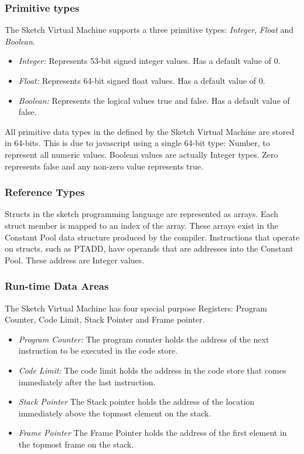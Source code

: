 \documentclass{l3proj}
\begin{document}
\subsubsection{Primitive types}
The Sketch Virtual Machine supports a three primitive types: \textit{Integer}, \textit{Float} and \textit{Boolean}.
\begin{itemize}
	\item \textit{Integer:} Represents 53-bit signed integer values. Has a default value of 0. 
	\item \textit{Float:} Represents 64-bit signed float values. Has a default value of 0.
	\item \textit{Boolean:} Represents the logical values true and false. Has a default value of false.
\end{itemize}
All primitive data types in the defined by the Sketch Virtual Machine are stored in 64-bits. This is due to javascript using a single 64-bit type: Number, to represent all numeric values. Boolean values are actually Integer types. Zero represents false and any non-zero value represents true.

\subsubsection{Reference Types}
Structs in the sketch programming language are represented as arrays. Each struct member is mapped to an index of the array. These arrays exist in the Constant Pool data structure produced by the compiler. Instructions that operate on structs, such as PTADD, have operands that are addresses into the Constant Pool. These address are Integer values.

\subsubsection{Run-time Data Areas}
The Sketch Virtual Machine has four special purpose Registers: Program Counter, Code Limit, Stack Pointer and Frame pointer.
\begin{itemize}
	\item\textit{Program Counter:} The program counter holds the address of the next instruction to be executed in the code store.
	\item\textit{Code Limit:} The code limit holds the address in the code store that comes immediately after the last instruction.
	\item\textit{Stack Pointer} The Stack pointer holds the address of the location immediately above the topmost element on the stack.
	\item\textit{Frame Pointer} The Frame Pointer holds the address of the first element in the topmost frame on the stack.
\end{itemize}
\end{document}
